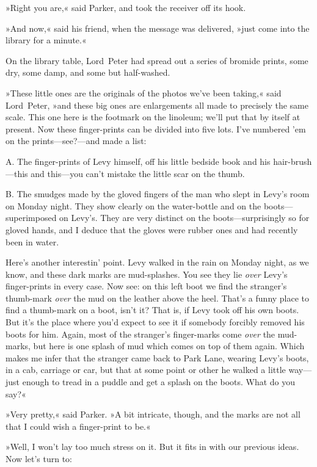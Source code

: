»Right you are,« said Parker, and took the receiver off its hook.

»And now,« said his friend, when the message was delivered, »just come into the library for a minute.«

On the library table, Lord~Peter had spread out a series of bromide prints, some dry, some damp, and some but half-washed.

»These little ones are the originals of the photos we've been taking,« said Lord~Peter, »and these big ones are enlargements all made to precisely the same scale. This one here is the footmark on the linoleum; we'll put that by itself at present. Now these finger-prints can be divided into five lots. I've numbered 'em on the prints—see?---and made a list:

\textsc{A\@.} The finger-prints of Levy himself, off his little bedside book and his hair-brush—this and this—you can't mistake the little scar on the thumb.

\textsc{B\@.} The smudges made by the gloved fingers of the man who slept in Levy's room on Monday night. They show clearly on the water-bottle and on the boots—superimposed on Levy's. They are very distinct on the boots—surprisingly so for gloved hands, and I deduce that the gloves were rubber ones and had recently been in water.

Here's another interestin' point. Levy walked in the rain on Monday night, as we know, and these dark marks are mud-splashes. You see they lie \textit{over} Levy's finger-prints in every case. Now see: on this left boot we find the stranger's thumb-mark \textit{over} the mud on the leather above the heel. That's a funny place to find a thumb-mark on a boot, isn't it? That is, if Levy took off his own boots. But it's the place where you'd expect to see it if somebody forcibly removed his boots for him. Again, most of the stranger's finger-marks come \textit{over} the mud-marks, but here is one splash of mud which comes on top of them again. Which makes me infer that the stranger came back to Park Lane, wearing Levy's boots, in a cab, carriage or car, but that at some point or other he walked a little way—just enough to tread in a puddle and get a splash on the boots. What do you say?«

»Very pretty,« said Parker. »A bit intricate, though, and the marks are not all that I could wish a finger-print to be.«

»Well, I won't lay too much stress on it. But it fits in with our previous ideas. Now let's turn to:

